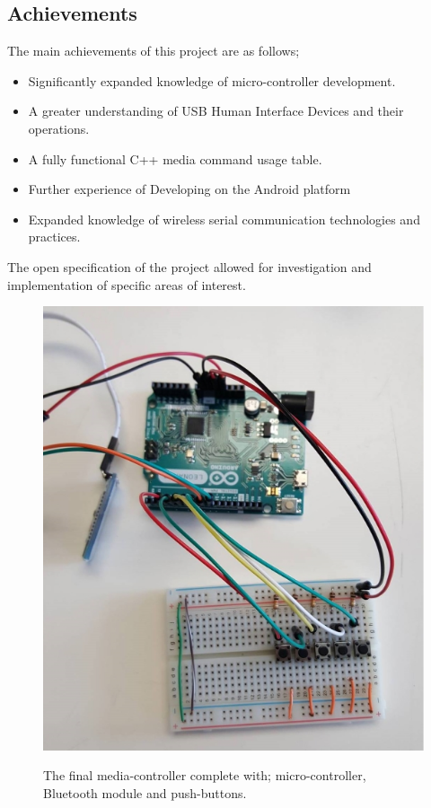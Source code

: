 \documentclass{article}
\begin{document}
		\subsection{Achievements}
			The main achievements of this project are as follows;
			
			\begin{itemize}
				\item Significantly expanded knowledge of micro-controller development.
				\item A greater understanding of USB Human Interface Devices and their operations.
				\item A fully functional C++ media command usage table.
				\item Further experience of Developing on the Android platform
				\item Expanded knowledge of wireless serial communication technologies and practices.
			\end{itemize}
			
			\noindent
			The open specification of the project allowed for investigation and implementation of specific areas of interest. 
			
				\begin{figure}[h]
					\centering
					\label{fullSystem}
					{\includegraphics[scale = 0.5]{fullSystem}}
					\caption{The final media-controller complete with; micro-controller, Bluetooth module and push-buttons.}
				\end{figure}
			
\end{document}
